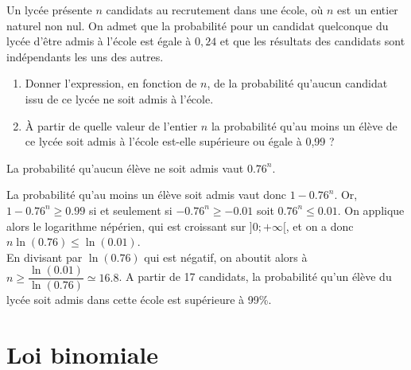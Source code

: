 \documentclass[11pt,fleqn, openany]{book} %
\begin{document}
\begin{exercise}[topic=prob11]Un lycée présente $n$ candidats au recrutement dans une école, où $n$ est un entier naturel non nul.
On admet que la probabilité pour un candidat quelconque du lycée d'être admis à l'école
est égale à $0,24$ et que les résultats des candidats sont indépendants les uns des autres.
\begin{enumerate}
\item Donner l'expression, en fonction de $n$, de la probabilité qu'aucun candidat issu de ce
lycée ne soit admis à l'école.
\item À partir de quelle valeur de l'entier $n$ la probabilité qu'au moins un élève de ce lycée
soit admis à l'école est-elle supérieure ou égale à 0,99 ?\end{enumerate}\end{exercise}

\begin{solution}La probabilité qu'aucun élève ne soit admis vaut $0.76^n$.

La probabilité qu'au moins un élève soit admis vaut donc $1-0.76^n$. Or, $1-0.76^n \geqslant 0.99$ si et seulement si $-0.76^n \geqslant -0.01$ soit $0.76^n \leqslant 0.01$. On applique alors le logarithme népérien, qui est croissant sur $]0;+\infty[$, et on a donc $n \ln(0.76) \leqslant \ln(0.01)$. \\ En divisant par $\ln\left(0.76\right)$ qui est négatif, on aboutit alors à $n \geqslant \dfrac{\ln(0.01)}{\ln(0.76)}\simeq 16.8$. A partir de 17 candidats, la probabilité qu'un élève du lycée soit admis dans cette école est supérieure à 99\%.\end{solution}




\section*{Loi binomiale}
\end{document}
